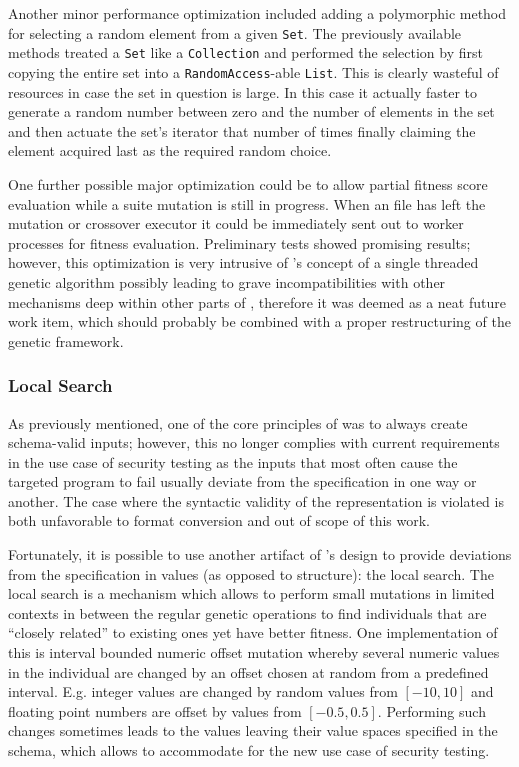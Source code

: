 Another minor performance optimization included adding a polymorphic method for selecting a random 
element from a given \texttt{Set}. The previously available methods treated a \texttt{Set} like a 
\java \texttt{Collection} and performed the selection by first copying the entire set into a 
\texttt{RandomAccess}-able \texttt{List}. This is clearly wasteful of resources in case the set in question is large.
In this case it actually faster to generate a random number between zero and the number of elements in 
the set and then actuate the set's iterator that number of times finally claiming the element acquired 
last as the required random choice.

One further possible major optimization could be to allow partial fitness score evaluation while a suite 
mutation is still in progress. When an \xml file has left the mutation or crossover executor it could be 
immediately sent out to worker processes for fitness evaluation. Preliminary tests showed promising 
results; however, this optimization is very intrusive of \evosuite's concept of a single threaded 
genetic algorithm possibly leading to grave incompatibilities with other mechanisms deep within other parts 
of \evosuite, therefore it was deemed as a neat future work item, which should probably be combined with a 
proper restructuring of the genetic framework. 
\subsubsection{Local Search}
As previously mentioned, one of the core principles of \xmlmate was to always create schema-valid inputs; 
however, this no longer complies with current requirements in the use case of security testing as the 
inputs that most often cause the targeted program to fail usually deviate from the specification in 
one way or another. The case where the syntactic validity of the \xml representation is violated is 
both unfavorable to format conversion and out of scope of this work.

Fortunately, it is possible to use another artifact of \evosuite's design to provide deviations from the 
specification in values (as opposed to structure): the local search. 
The local search is a mechanism which allows to perform small mutations in limited contexts in between 
the regular genetic operations to find individuals that are ``closely related'' to existing ones
yet have better fitness. One implementation of this is interval bounded numeric offset mutation whereby
several numeric values in the individual are changed by an offset chosen at random from a predefined 
interval. E.g. integer values are changed by random values from $[-10,10]$ and floating point numbers 
are offset by values from $[-0.5,0.5]$.
Performing such changes sometimes leads to the values leaving their value spaces specified in the schema, 
which allows to accommodate for the new use case of security testing.

